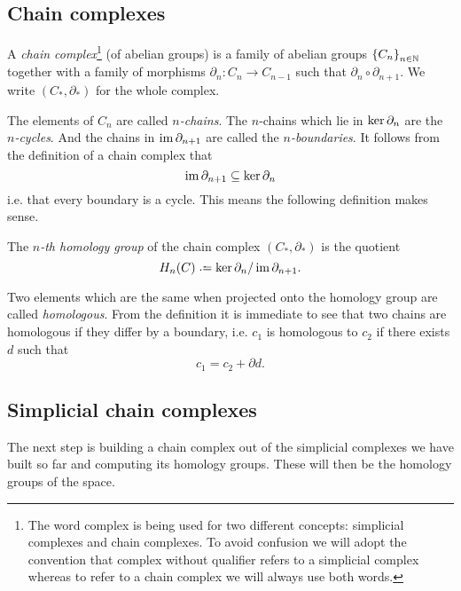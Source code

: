 \documentclass[../main.tex]{subfiles}
\begin{document}
\subsection{Chain complexes}
\begin{definition}
	A \emph{chain complex}\footnote{The word complex is being used for two different
		concepts: simplicial complexes and chain complexes. To avoid confusion we will adopt
		the convention that complex without qualifier refers to a simplicial complex whereas
	to refer to a chain complex we will always use both words.} (of abelian groups) is a
	family of abelian groups \( \left\{ C_n \right\}_{n \in \mathbb{N}} \) together with a family of
	morphisms \( \partial_n \colon C_n \to C_{n-1} \) such that \( \partial_n \circ
	\partial_{n+1} \). We write \( (C_\ast, \partial_\ast) \) for the whole complex. 
\end{definition}
The elements of \( C_n \) are called \emph{\( n \)-chains}. The \( n \)-chains which lie
in \( \ker{\partial}_{n} \) are the \emph{\( n \)-cycles}. And the chains in
\emph{\( \operatorname{im}{\partial}_{n+1} \)} are called the \emph{\( n \)-boundaries}. It
follows from the definition of a chain complex that
\begin{equation*}
	\operatorname{im}{\partial}_{n+1} \subseteq \ker{\partial}_{n}
\end{equation*}
i.e. that every boundary is a cycle. This means the following definition makes sense.
\begin{definition}
	The \emph{\( n \)-th homology group} of the chain complex \( (C_\ast, \partial_\ast) \)
	is the quotient
	\begin{equation*}
		H_n(C) \defeq \cyc{n} / \bound{n+1}.
	\end{equation*}
\end{definition}
Two elements which are the same when projected onto the homology group are called
\emph{homologous}. From the definition it is immediate to see that two chains are
homologous if they differ by a boundary, i.e. \( c_1 \) is homologous to \( c_2 \) if
there exists \( d \) such that
\begin{equation*}
	c_1 = c_2 + \partial d. 
\end{equation*}

\subsection{Simplicial chain complexes}
The next step is building a chain complex out of the simplicial complexes we have built so
far and computing its homology groups. These will then be the homology groups of the
space. 
\end{document}
